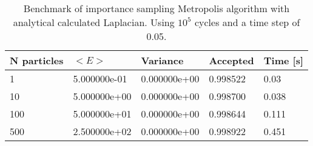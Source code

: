 \begin{table}[h!]
\centering 
\begin{tabular}{|l|l|l|l|l|}
\hline 
N particles & $<E>$ & Variance & Accepted & Time [s]\\ 
 \hline 
1 & 5.000000e-01 & 0.000000e+00 & 0.998522 & 0.03 \\ \hline 
10 & 5.000000e+00 & 0.000000e+00 & 0.998700 & 0.038 \\ \hline 
100 & 5.000000e+01 & 0.000000e+00 & 0.998644 & 0.111 \\ \hline 
500 & 2.500000e+02 & 0.000000e+00 & 0.998922 & 0.451 \\ \hline 
\end{tabular}
\caption{%
	  Benchmark of importance sampling Metropolis algorithm %
	  with analytical calculated Laplacian. Using $10^5$ cycles %
	  and a time step of 0.05.%
	}
\label{tab:ia1} 
\end{table} 
